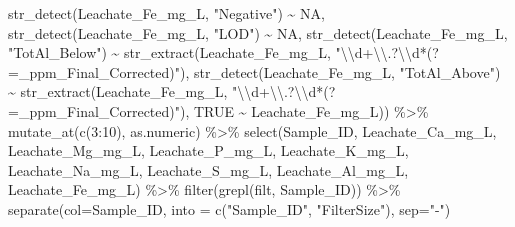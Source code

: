 \documentclass[
]{article}
\newenvironment{Shaded}{\begin{snugshade}}{\end{snugshade}}
\newcommand{\AttributeTok}[1]{\textcolor[rgb]{0.77,0.63,0.00}{#1}}
\newcommand{\ConstantTok}[1]{\textcolor[rgb]{0.00,0.00,0.00}{#1}}
\newcommand{\DecValTok}[1]{\textcolor[rgb]{0.00,0.00,0.81}{#1}}
\newcommand{\FunctionTok}[1]{\textcolor[rgb]{0.00,0.00,0.00}{#1}}
\newcommand{\NormalTok}[1]{#1}
\newcommand{\SpecialCharTok}[1]{\textcolor[rgb]{0.00,0.00,0.00}{#1}}
\newcommand{\StringTok}[1]{\textcolor[rgb]{0.31,0.60,0.02}{#1}}
\begin{document}
\begin{Shaded}
\begin{Highlighting}[]
                \FunctionTok{str\_detect}\NormalTok{(Leachate\_Fe\_mg\_L, }\StringTok{"Negative"}\NormalTok{) }\SpecialCharTok{\textasciitilde{}} \ConstantTok{NA}\NormalTok{, }
                \FunctionTok{str\_detect}\NormalTok{(Leachate\_Fe\_mg\_L, }\StringTok{"LOD"}\NormalTok{) }\SpecialCharTok{\textasciitilde{}} \ConstantTok{NA}\NormalTok{, }
                \FunctionTok{str\_detect}\NormalTok{(Leachate\_Fe\_mg\_L, }\StringTok{"TotAl\_Below"}\NormalTok{) }\SpecialCharTok{\textasciitilde{}} 
                \FunctionTok{str\_extract}\NormalTok{(Leachate\_Fe\_mg\_L, }\StringTok{"}\SpecialCharTok{\textbackslash{}\textbackslash{}}\StringTok{d+}\SpecialCharTok{\textbackslash{}\textbackslash{}}\StringTok{.?}\SpecialCharTok{\textbackslash{}\textbackslash{}}\StringTok{d*(?=\_ppm\_Final\_Corrected)"}\NormalTok{),}
                \FunctionTok{str\_detect}\NormalTok{(Leachate\_Fe\_mg\_L, }\StringTok{"TotAl\_Above"}\NormalTok{) }\SpecialCharTok{\textasciitilde{}} 
                \FunctionTok{str\_extract}\NormalTok{(Leachate\_Fe\_mg\_L, }\StringTok{"}\SpecialCharTok{\textbackslash{}\textbackslash{}}\StringTok{d+}\SpecialCharTok{\textbackslash{}\textbackslash{}}\StringTok{.?}\SpecialCharTok{\textbackslash{}\textbackslash{}}\StringTok{d*(?=\_ppm\_Final\_Corrected)"}\NormalTok{),}
                \ConstantTok{TRUE} \SpecialCharTok{\textasciitilde{}}\NormalTok{ Leachate\_Fe\_mg\_L))  }\SpecialCharTok{\%\textgreater{}\%}
  \FunctionTok{mutate\_at}\NormalTok{(}\FunctionTok{c}\NormalTok{(}\DecValTok{3}\SpecialCharTok{:}\DecValTok{10}\NormalTok{), as.numeric) }\SpecialCharTok{\%\textgreater{}\%}
  \FunctionTok{select}\NormalTok{(Sample\_ID, Leachate\_Ca\_mg\_L,  Leachate\_Mg\_mg\_L, Leachate\_P\_mg\_L, Leachate\_K\_mg\_L, Leachate\_Na\_mg\_L, Leachate\_S\_mg\_L, Leachate\_Al\_mg\_L, Leachate\_Fe\_mg\_L) }\SpecialCharTok{\%\textgreater{}\%}
  \FunctionTok{filter}\NormalTok{(}\FunctionTok{grepl}\NormalTok{(}\StringTok{\textquotesingle{}filt\textquotesingle{}}\NormalTok{, Sample\_ID)) }\SpecialCharTok{\%\textgreater{}\%}
  \FunctionTok{separate}\NormalTok{(}\AttributeTok{col=}\NormalTok{Sample\_ID, }\AttributeTok{into =} \FunctionTok{c}\NormalTok{(}\StringTok{"Sample\_ID"}\NormalTok{, }\StringTok{"FilterSize"}\NormalTok{), }\AttributeTok{sep=}\StringTok{"{-}"}\NormalTok{) }


\end{Highlighting}
\end{Shaded}
\end{document}
